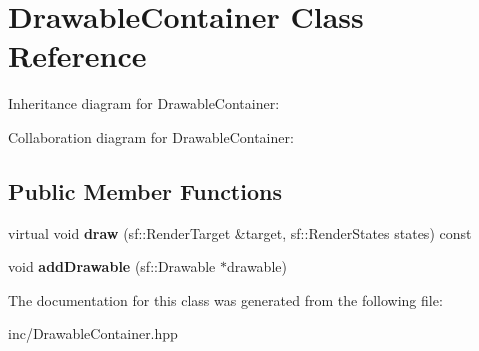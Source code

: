 \hypertarget{class_drawable_container}{\section{Drawable\+Container Class Reference}
\label{class_drawable_container}
}


Inheritance diagram for Drawable\+Container\+:


Collaboration diagram for Drawable\+Container\+:
\subsection*{Public Member Functions}
\begin{DoxyCompactItemize}
\item 
\hypertarget{class_drawable_container_ab334fe84f8b02ca8c6bc220245f408c5}{virtual void {\bfseries draw} (sf\+::\+Render\+Target \&target, sf\+::\+Render\+States states) const }\label{class_drawable_container_ab334fe84f8b02ca8c6bc220245f408c5}

\item 
\hypertarget{class_drawable_container_a7ca561deb60c18f75b09006c5940336d}{void {\bfseries add\+Drawable} (sf\+::\+Drawable $\ast$drawable)}\label{class_drawable_container_a7ca561deb60c18f75b09006c5940336d}

\end{DoxyCompactItemize}


The documentation for this class was generated from the following file\+:\begin{DoxyCompactItemize}
\item 
inc/Drawable\+Container.\+hpp\end{DoxyCompactItemize}
